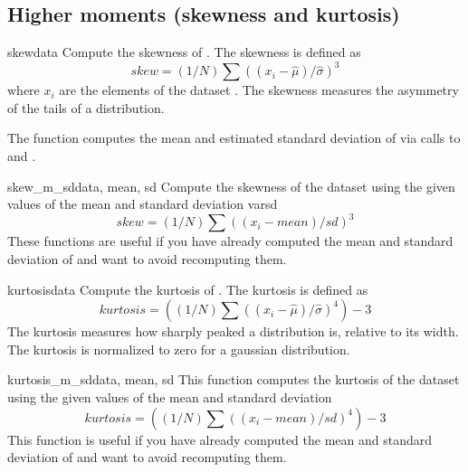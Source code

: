 \subsection{Higher moments (skewness and kurtosis)}
\label{sec:stat:higher-moments}

\begin{funcdesc}{skew}{data}
   Compute the skewness of .  The skewness is defined as
   \begin{equation}
      skew = (1/N) \sum ((x_i - \hat\mu)/\hat\sigma)^3
   \end{equation}
   where $x_i$ are the elements of the dataset .  The skewness
   measures the asymmetry of the tails of a distribution.
   
   The function computes the mean and estimated standard deviation of
    via calls to  and .
\end{funcdesc}


\begin{funcdesc}{skew_m_sd}{data, mean, sd}
   Compute the skewness of the dataset  using the given values of the
   mean  and standard deviation var{sd}
   \begin{equation}
      skew = (1/N) \sum ((x_i - mean)/sd)^3
   \end{equation}
   These functions are useful if you have already computed the mean and
   standard deviation of  and want to avoid recomputing them.
\end{funcdesc}


\begin{funcdesc}{kurtosis}{data}
   Compute the kurtosis of .  The kurtosis is defined as
   \begin{equation}
      kurtosis = ((1/N) \sum ((x_i - \hat\mu)/\hat\sigma)^4) - 3
   \end{equation}
   The kurtosis measures how sharply peaked a distribution is, relative to its
   width.  The kurtosis is normalized to zero for a gaussian distribution.
\end{funcdesc}


\begin{funcdesc}{kurtosis_m_sd}{data, mean, sd}
   This function computes the kurtosis of the dataset  using the
   given values of the mean  and standard deviation 
   \begin{equation}
      kurtosis = ((1/N) \sum ((x_i - mean)/sd)^4) - 3
   \end{equation}
   This function is useful if you have already computed the mean and standard
   deviation of  and want to avoid recomputing them.
\end{funcdesc}



